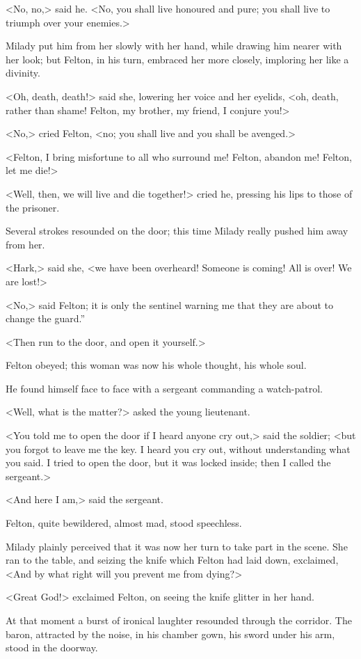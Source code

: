 <No, no,> said he. <No, you shall live honoured and pure; you shall live to triumph over your enemies.> 

Milady put him from her slowly with her hand, while drawing him nearer with her look; but Felton, in his turn, embraced her more closely, imploring her like a divinity. 

<Oh, death, death!> said she, lowering her voice and her eyelids, <oh, death, rather than shame! Felton, my brother, my friend, I conjure you!> 

<No,> cried Felton, <no; you shall live and you shall be avenged.> 

<Felton, I bring misfortune to all who surround me! Felton, abandon me! Felton, let me die!> 

<Well, then, we will live and die together!> cried he, pressing his lips to those of the prisoner. 

Several strokes resounded on the door; this time Milady really pushed him away from her. 

<Hark,> said she, <we have been overheard! Someone is coming! All is over! We are lost!> 

<No,> said Felton; it is only the sentinel warning me that they are about to change the guard.” 

<Then run to the door, and open it yourself.> 

Felton obeyed; this woman was now his whole thought, his whole soul. 

He found himself face to face with a sergeant commanding a watch-patrol. 

<Well, what is the matter?> asked the young lieutenant. 

<You told me to open the door if I heard anyone cry out,> said the soldier; <but you forgot to leave me the key. I heard you cry out, without understanding what you said. I tried to open the door, but it was locked inside; then I called the sergeant.> 

<And here I am,> said the sergeant. 

Felton, quite bewildered, almost mad, stood speechless. 

Milady plainly perceived that it was now her turn to take part in the scene. She ran to the table, and seizing the knife which Felton had laid down, exclaimed, <And by what right will you prevent me from dying?> 

<Great God!> exclaimed Felton, on seeing the knife glitter in her hand. 

At that moment a burst of ironical laughter resounded through the corridor. The baron, attracted by the noise, in his chamber gown, his sword under his arm, stood in the doorway. 

